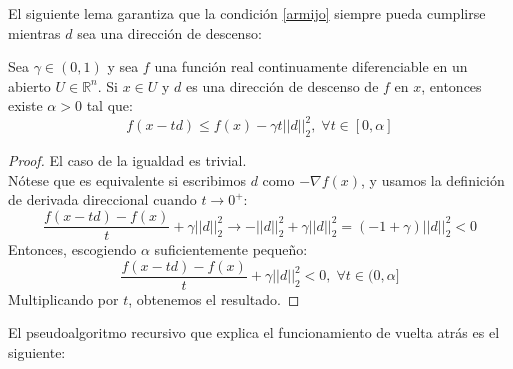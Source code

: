 
El siguiente lema garantiza que la condición \ref{armijo} siempre pueda cumplirse mientras $d$ sea una dirección de descenso:

\begin{lemma}
	Sea $\gamma \in (0,1)$ y sea $f$ una función real continuamente diferenciable en un abierto $U \in \mathbb{R}^n$. Si $x \in U$ y $d$ es una dirección de descenso de $f$ en $x$, entonces existe $\alpha > 0$ tal que:
		\[f(x-t d) \leq f(x) - \gamma t ||d||_2^2, \; \forall t \in [0,\alpha]\]
\end{lemma}
\begin{proof}
	El caso de la igualdad es trivial.\\
	Nótese que es equivalente si escribimos $d$ como $-\nabla f(x)$, y usamos la definición de derivada direccional cuando $t \rightarrow 0^+$:
	\[ \frac{ f(x - t d) - f(x)}{t} + \gamma ||d||_2^2 \longrightarrow -||d||_2^2 + \gamma ||d||_2^2 = (-1 + \gamma) ||d||_2^2 < 0 \]
	Entonces, escogiendo $\alpha$ suficientemente pequeño:
	\[ \frac{f(x - t d) -f(x)}{t} + \gamma ||d||_2^2 < 0, \; \forall  t \in (0,\alpha]\]
	Multiplicando por $t$, obtenemos el resultado.
\end{proof}

El pseudoalgoritmo recursivo que explica el funcionamiento de vuelta atrás es el siguiente:

